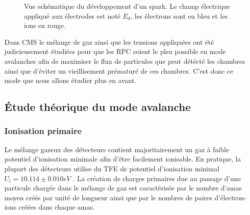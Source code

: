 \begin{figure}[ht!]
    \hfill
	\caption{Vue schématique du développement d'un spark. Le champ électrique appliqué aux électrodes est noté $E_{0}$, les électrons sont en bleu et les ions en rouge.}
	\label{spark}
\end{figure}


Dans CMS le mélange de gaz ainsi que les tensions appliquées ont été judicieusement étudiées pour que les RPC soient le plsu possible en mode avalanches afin de maximiser le flux de particules que peut détécté les chambres ainsi que d'éviter un vieillisement prématuré de ces chambres. C'est donc ce mode que nous allons étudier plus en avant.

\subsection{Étude théorique du mode avalanche}

\subsubsection{Ionisation primaire}
Le mélange gazeux des détecteurs contient majoritairement un gaz à faible potentiel d'ionisation minimale afin d'être facilement ionisable. En pratique, la plupart des détecteurs utilise du TFE de potentiel d'ionisation minimal $U_{i}=10.114 \pm0.010eV$ \cite{Chimie:chimie}. La création de charges primaires due au passage d'une particule chargée dans le mélange de gaz est caractérisée par le nombre d'amas moyen créés par unité de longueur ainsi que par le nombres de paires d'électron-ions créées dans chaque amas.


